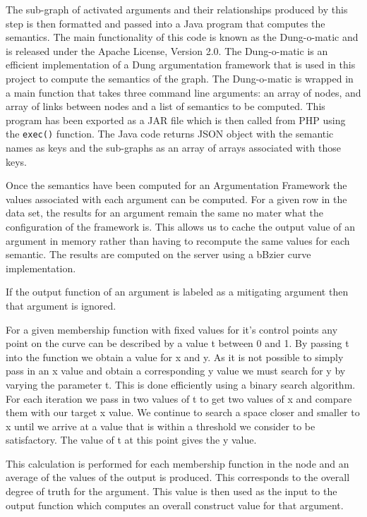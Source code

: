 The sub-graph of activated arguments and their relationships produced by this step is then formatted and passed into a Java program that computes the semantics. The main functionality of this code is known as the Dung-o-matic and is released under the Apache License, Version 2.0. The Dung-o-matic is an efficient implementation of a Dung argumentation framework that is used in this project to compute the semantics of the graph. The Dung-o-matic is wrapped in a main function that takes three command line arguments: an array of nodes, and array of links between nodes and a list of semantics to be computed. This program has been exported as a JAR file which is then called from PHP using the \lstinline{exec()} function. The Java code returns JSON object with the semantic names as keys and the sub-graphs as an array of arrays associated with those keys.

Once the semantics have been computed for an Argumentation Framework the values associated with each argument can be computed. For a given row in the data set, the results for an argument remain the same no mater what the configuration of the framework is. This allows us to cache the output value of an argument in memory rather than having to recompute the same values for each semantic. The results are computed on the server using a bBzier curve implementation.

If the output function of an argument is labeled as a mitigating argument then that argument is ignored.


For a given membership function with fixed values for it's control points any point on the curve can be described by a value t between 0 and 1. By passing t into the function we obtain a value for x and y. As it is not possible to simply pass in an x value and obtain a corresponding y value we must search for y by varying the parameter t. This is done efficiently using a binary search algorithm. For each iteration we pass in two values of t to get two values of x and compare them with our target x value. We continue to search a space closer and smaller to x until we arrive at a value that is within a threshold we consider to be satisfactory. The value of t at this point gives the y value.

This calculation is performed for each membership function in the node and an average of the values of the output is produced. This corresponds to the overall degree of truth for the argument. This value is then used as the input to the output function which computes an overall construct value for that argument. 

